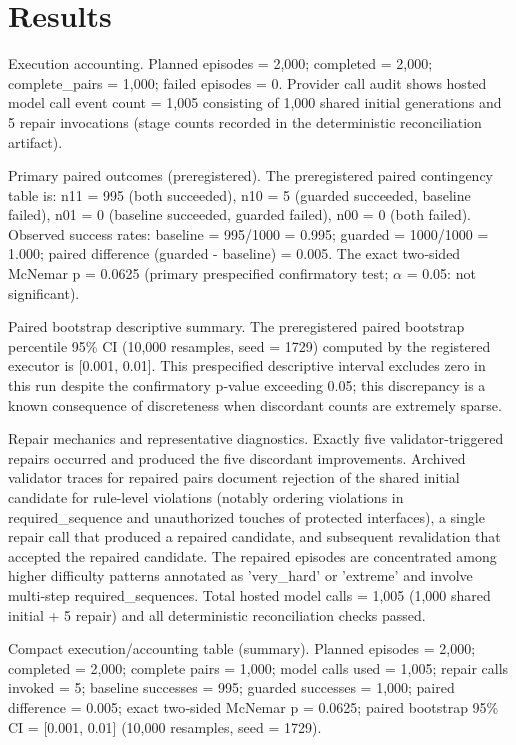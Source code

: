 \documentclass[conference]{IEEEtran}
\begin{document}
\section{Results}
Execution accounting. Planned episodes = 2,000; completed = 2,000; complete\_pairs = 1,000; failed episodes = 0. Provider call audit shows hosted model call event count = 1,005 consisting of 1,000 shared initial generations and 5 repair invocations (stage counts recorded in the deterministic reconciliation artifact).

Primary paired outcomes (preregistered). The preregistered paired contingency table is: n11 = 995 (both succeeded), n10 = 5 (guarded succeeded, baseline failed), n01 = 0 (baseline succeeded, guarded failed), n00 = 0 (both failed). Observed success rates: baseline = 995/1000 = 0.995; guarded = 1000/1000 = 1.000; paired difference (guarded - baseline) = 0.005. The exact two‑sided McNemar p = 0.0625 (primary prespecified confirmatory test; \ensuremath{\alpha} = 0.05: not significant).

Paired bootstrap descriptive summary. The preregistered paired bootstrap percentile 95\% CI (10,000 resamples, seed = 1729) computed by the registered executor is [0.001, 0.01]. This prespecified descriptive interval excludes zero in this run despite the confirmatory p‑value exceeding 0.05; this discrepancy is a known consequence of discreteness when discordant counts are extremely sparse.

Repair mechanics and representative diagnostics. Exactly five validator‑triggered repairs occurred and produced the five discordant improvements. Archived validator traces for repaired pairs document rejection of the shared initial candidate for rule‑level violations (notably ordering violations in required\_sequence and unauthorized touches of protected interfaces), a single repair call that produced a repaired candidate, and subsequent revalidation that accepted the repaired candidate. The repaired episodes are concentrated among higher difficulty patterns annotated as 'very\_hard' or 'extreme' and involve multi‑step required\_sequences. Total hosted model calls = 1,005 (1,000 shared initial + 5 repair) and all deterministic reconciliation checks passed.

Compact execution/accounting table (summary). Planned episodes = 2,000; completed = 2,000; complete pairs = 1,000; model calls used = 1,005; repair calls invoked = 5; baseline successes = 995; guarded successes = 1,000; paired difference = 0.005; exact two‑sided McNemar p = 0.0625; paired bootstrap 95\% CI = [0.001, 0.01] (10,000 resamples, seed = 1729).
\end{document}
